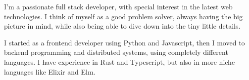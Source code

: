 

\begin{cvparagraph}

I'm a passionate full stack developer, with special interest in the latest web technologies. I think of myself as a good problem solver, always having the big picture in mind, while also being able to dive down into the tiny little details.

I started as a frontend developer using Python and Javascript, then I moved to backend programming and distributed systems, using completely different languages. I have experience in Rust and Typescript, but also in more niche languages like Elixir and Elm.
\end{cvparagraph}

